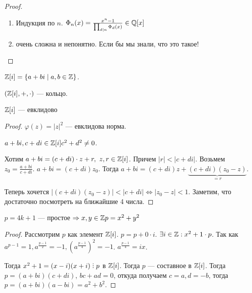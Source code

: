 \begin{proof}
    \begin{enumerate}
        \item Индукция по $n$.  $\Phi_n(x) = \frac{x^n - 1}{\prod_{d \mid n}\Phi_d(x)} \in \mathbb{Q}[x]$
        \item очень сложна и непонятно. Если бы мы знали, что это такое!
    \end{enumerate}
\end{proof}
\begin{definition}
    $\mathbb{Z}[i] = \{a + bi \mid a, b \in \mathbb{Z}\}$.
\end{definition}
\begin{statement}
    $(\mathbb{Z}[i], +, \cdot)$ --- кольцо.
\end{statement}
\begin{theorem}
    $\mathbb{Z}[i]$ --- евклидово
\end{theorem}
\begin{proof}
    $\varphi(z) = |z|^2$ --- евклидова норма.

    $a+bi, c+di \in \mathbb{Z}[i] c^2 + d^2 \neq 0$. 

    Хотим  $a+bi=(c+di)\cdot z +r,\ z,r \in \mathbb{Z}[i]$. Причем $|r| < |c+di|$. Возьмем  $z_0 = \frac{a+bi}{c+di}$. $a+bi = (c+di)z_0$. Тогда  $a+bi = (c+di)z + \underbrace{(c+di)(z_0-z)}_{=r}$. 

    Теперь хочется  $|(c+di)(z_0-z)| < |c+di| \iff |z_0 - z| < 1$. Заметим, что достаточно посмотреть на ближайшие 4 числа.
\end{proof}

\begin{theorem}
    $p = 4k + 1$ --- простое  $\Rightarrow x, y \in \mathbb{Z} p = x^2+y^2$
\end{theorem}
\begin{proof}
    Рассмотрим $p$ как элемент  $\mathbb{Z}[i]$.  $p = p + 0 \cdot i$.  $\exists i \in \mathbb{Z}: x^2 + 1 \cdot p$. Так как  $a^{p-1} = 1, a^{\frac{p - 1}{2}} = -1, (a^{\frac{p-1}{4}})^2 = -1$. $a^{\frac{p-1}{4}} = ix$.

    Тогда $x^2+1 = (x-i)(x+i) \divby p$ в  $\mathbb{Z}[i]$. Тогда  $p$ --- составное в  $\mathbb{Z}[i]$. Тогда  $p = (a+bi)(c+di)$,  $bc + ad = 0$, откуда получаем  $c = a, d = -b$, тогда  $p = (a+bi)(a-bi) = a^2+b^2$. 
\end{proof}
